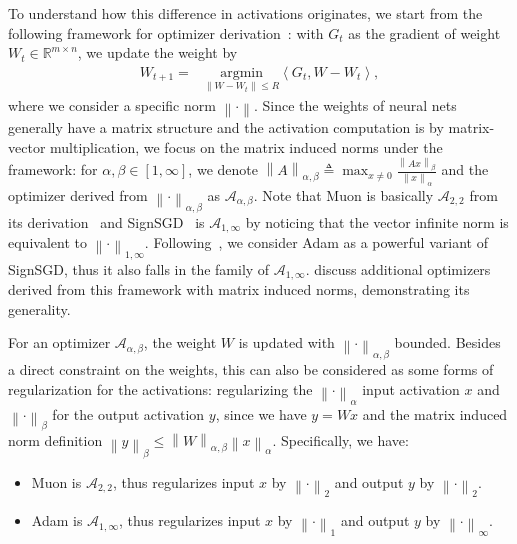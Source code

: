 \documentclass{article}
\theoremstyle{remark}
\newcommand{\Norm}[1]{\left\|#1\right\|}
\newcommand{\dotprod}[2]{\left\langle#1,#2\right\rangle}
\newcommand{\RR}{\mathbb{R}}
\newcommand{\cA}{\mathcal{A}}
\begin{document}
To understand how this difference in activations originates, we start from the following framework for optimizer derivation~\citep{pethick2025training}: with $G_t$ as the gradient of weight $W_t \in \RR^{m\times n}$, we update the weight by
\begin{align}\label{eq:steepest_descent}
    W_{t+1} =& \underset{\Norm{W - W_t} \le R}{\text{argmin}} \dotprod{G_t}{W - W_t}  ,
\end{align}
where we consider a specific norm $\Norm{\cdot}$.
Since the weights of neural nets generally have a matrix structure and the activation computation is by matrix-vector multiplication, we focus on the matrix induced norms under the framework: for $\alpha, \beta \in [1,\infty]$, we denote
$
    \Norm{A}_{\alpha,\beta} \triangleq \max_{x \neq 0}\frac{\Norm{Ax}_{\beta}}{\Norm{x}_{\alpha}} 
$
and the optimizer derived from $\Norm{\cdot}_{\alpha,\beta}$ as $\cA_{\alpha,\beta}$.
Note that Muon is basically $\cA_{2,2}$ from its derivation~\citep{jordan2024muon,bernstein2024old} and SignSGD~\citep{bernstein2018signsgd} is $\cA_{1,\infty}$ by noticing that the vector infinite norm is equivalent to $\Norm{\cdot}_{1,\infty}$. Following~\citet{balles2018dissecting,balles2020geometry,kunstner2023noise}, we consider Adam as a powerful variant of SignSGD, thus it also falls in the family of $\cA_{1,\infty}$. \citet{pethick2025training,xu2026width} discuss additional optimizers derived from this framework with matrix induced norms, demonstrating its generality.

For an optimizer $\cA_{\alpha,\beta}$, the weight $W$ is updated with $\Norm{\cdot}_{\alpha,\beta}$ bounded. Besides a direct constraint on the weights, this can also be considered as some forms of regularization for the activations: regularizing the $\Norm{\cdot}_{\alpha}$ input activation $x$ and $\Norm{\cdot}_{\beta}$ for the output activation $y$, since we have $y = Wx$ and the matrix induced norm definition $\Norm{y}_\beta \le \Norm{W}_{\alpha,\beta} \Norm{x}_\alpha$. Specifically, we have:

\begin{itemize}
    \item Muon is $\cA_{2,2}$, thus regularizes input $x$ by $\Norm{\cdot}_2$ and output $y$ by $\Norm{\cdot}_2$.
    
    \item Adam is $\cA_{1,\infty}$, thus regularizes input $x$ by $\Norm{\cdot}_1$ and output $y$ by $\Norm{\cdot}_\infty$.
\end{itemize}
\end{document}
